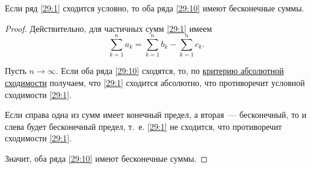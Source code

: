 \documentclass[../../main.tex]{subfiles}
\begin{document}
	\begin{thm}\label{29:conditional_conv}
		Если ряд \eqref{29:1} сходится условно, 
		то оба ряда \eqref{29:10} имеют бесконечные суммы.
	\end{thm}
	\begin{proof}
		Действительно, для частичных сумм \eqref{29:1} имеем 
		\[\sum_{k = 1}^n a_k = \sum_{k = 1}^n b_k - \sum_{k = 1}^n c_k.\]
		
		Пусть $n\to\infty$. Если оба ряда \eqref{29:10} сходятся, 
		то, по \hyperref[29:absolute_conv]{критерию абсолютной сходимости} 
		получаем, что \eqref{29:1} сходится абсолютно, что противоречит 
		условной сходимости \eqref{29:1}.
		
		Если справа одна из сумм имеет конечный предел, а вторая~--- бесконечный,
		 то и слева будет бесконечный предел, т.~е. \eqref{29:1} не сходится,
		  что противоречит сходимости \eqref{29:1}.
		
		Значит, оба ряда \eqref{29:10} имеют бесконечные суммы.
	\end{proof}
\end{document}
